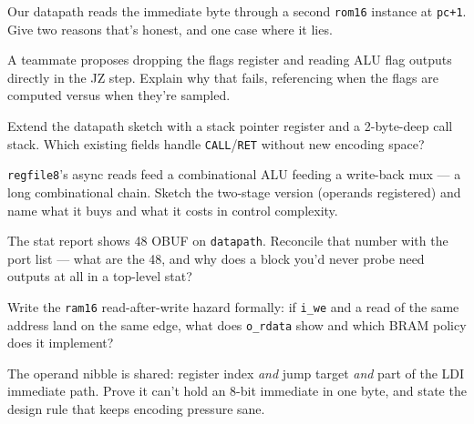 \begin{exercise}[hard]
Our datapath reads the immediate byte through a second \texttt{rom16}
instance at \texttt{pc+1}. Give two reasons that's honest, and one
case where it lies.
\end{exercise}
\begin{exercise}[hard]
A teammate proposes dropping the flags register and reading ALU flag
outputs directly in the JZ step. Explain why that fails, referencing
when the flags are computed versus when they're sampled.
\end{exercise}
\begin{exercise}[hard]
Extend the datapath sketch with a stack pointer register and a
2-byte-deep call stack. Which existing fields handle
\texttt{CALL}/\texttt{RET} without new encoding space?
\end{exercise}
\begin{exercise}[hard]
\texttt{regfile8}'s async reads feed a combinational ALU feeding a
write-back mux --- a long combinational chain. Sketch the two-stage
version (operands registered) and name what it buys and what it costs
in control complexity.
\end{exercise}
\begin{exercise}[hard]
The stat report shows 48 OBUF on \texttt{datapath}. Reconcile that
number with the port list --- what are the 48, and why does a block
you'd never probe need outputs at all in a top-level stat?
\end{exercise}
\begin{exercise}[hard]
Write the \texttt{ram16} read-after-write hazard formally: if
\texttt{i\_we} and a read of the same address land on the same edge,
what does \texttt{o\_rdata} show and which BRAM policy does it
implement?
\end{exercise}
\begin{exercise}[hard]
The operand nibble is shared: register index \emph{and} jump target
\emph{and} part of the LDI immediate path. Prove it can't hold an
8-bit immediate in one byte, and state the design rule that keeps
encoding pressure sane.
\end{exercise}

